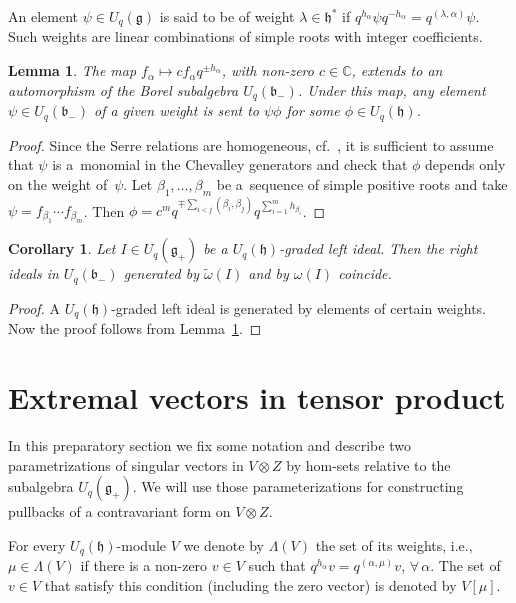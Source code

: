 \documentclass[11pt]{article}
\numberwithin{equation}{section}
\newtheorem{Corollary}[Theorem]{Corollary}
\newtheorem{Lemma}[Theorem]{Lemma}
\begin{document}
An element $\psi\in U_q(\mathfrak{g})$ is said to be of weight $\lambda\in \mathfrak{h}^*$ if $q^{h_\alpha}\psi q^{-h_\alpha}=q^{(\lambda,\alpha)}\psi$. Such weights are linear combinations of simple roots with integer coefficients.

\begin{Lemma}\label{eq-ideals} The map $f_{\alpha}\mapsto c f_{\alpha}q^{\pm h_\alpha}$, with non-zero $c\in \mathbb{C}$, extends to an automorphism of the Borel subalgebra $U_q(\mathfrak{b}_-)$. Under this map, any element $\psi\in U_q(\mathfrak{b}_-)$ of a given weight is sent to $\psi \phi$ for some $\phi\in U_q(\mathfrak{h})$.
\end{Lemma}

\begin{proof} Since the Serre relations are homogeneous, cf.~\cite{ChP}, it is sufficient to assume that $\psi$ is a~monomial in the Chevalley generators and check that $\phi$ depends only on the weight of~$\psi$. Let $\beta_1,\ldots, \beta_m$ be a~sequence of simple positive roots and take $\psi=f_{\beta_1}\cdots f_{\beta_{m}}$. Then $\phi=c^m q^{\mp \sum_{i<j}(\beta_i,\beta_j)}q^{\sum_{i=1}^{m}h_{\beta_i}}$.
\end{proof}
\begin{Corollary}\label{inv-ideals}Let $I\in U_q(\mathfrak{g}_+)$ be a $U_q(\mathfrak{h})$-graded left ideal. Then the right ideals in $U_q(\mathfrak{b}_-)$ generated by $\tilde \omega(I)$ and by $\omega(I)$ coincide.
\end{Corollary}
\begin{proof} A $U_q(\mathfrak{h})$-graded left ideal is generated by elements of certain weights. Now the proof follows from Lemma~\ref{eq-ideals}.
\end{proof}

\section{Extremal vectors in tensor product}
In this preparatory section we fix some notation and describe two parametrizations of singular vectors in $V\otimes Z$ by hom-sets relative to the subalgebra $U_q(\mathfrak{g}_+)$. We will use those parameterizations for constructing pullbacks of a contravariant form on $V\otimes Z$.

For every $U_q(\mathfrak{h})$-module $V$ we denote by $\Lambda(V)$ the set of its weights, i.e., $\mu\in \Lambda(V)$ if there is a non-zero $v\in V$ such that $q^{h_{\alpha}}v=q^{(\alpha,\mu)}v$, $\forall\, \alpha$. The set of $v\in V$ that satisfy this condition (including the zero vector) is denoted by $V[\mu]$.
\end{document}
